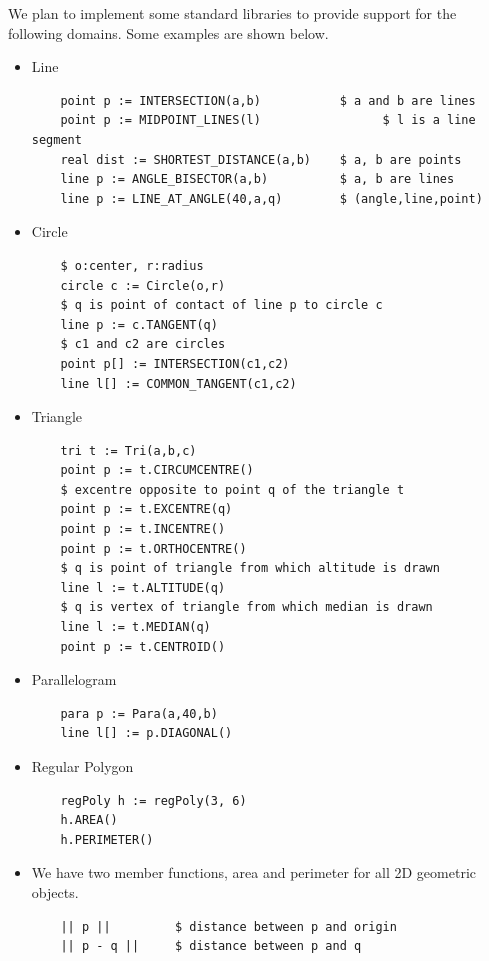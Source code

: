 \documentclass[12pt]{article}
\begin{document}
We plan to implement some standard libraries to provide support for the following domains. Some examples are shown below.
\begin{itemize}
    \item Line 
\begin{verbatim}
    point p := INTERSECTION(a,b)           $ a and b are lines
    point p := MIDPOINT_LINES(l)                 $ l is a line segment
    real dist := SHORTEST_DISTANCE(a,b)    $ a, b are points
    line p := ANGLE_BISECTOR(a,b)          $ a, b are lines
    line p := LINE_AT_ANGLE(40,a,q)        $ (angle,line,point)
\end{verbatim}
\item Circle
\begin{verbatim}
    $ o:center, r:radius
    circle c := Circle(o,r)                 
    $ q is point of contact of line p to circle c
    line p := c.TANGENT(q)  
    $ c1 and c2 are circles               
    point p[] := INTERSECTION(c1,c2)   
    line l[] := COMMON_TANGENT(c1,c2)
\end{verbatim}

\item Triangle
\begin{verbatim}
    tri t := Tri(a,b,c)
    point p := t.CIRCUMCENTRE()
    $ excentre opposite to point q of the triangle t
    point p := t.EXCENTRE(q) 
    point p := t.INCENTRE()    
    point p := t.ORTHOCENTRE() 
    $ q is point of triangle from which altitude is drawn  
    line l := t.ALTITUDE(q)
    $ q is vertex of triangle from which median is drawn  
    line l := t.MEDIAN(q)
    point p := t.CENTROID()            
\end{verbatim}

\item Parallelogram
\begin{verbatim}
    para p := Para(a,40,b)
    line l[] := p.DIAGONAL()
\end{verbatim}
\item Regular Polygon
\begin{verbatim}
    regPoly h := regPoly(3, 6)
    h.AREA()
    h.PERIMETER()
\end{verbatim}
\item We have two member functions, area and perimeter for all 2D geometric objects.
\begin{verbatim}
    || p ||         $ distance between p and origin
    || p - q ||     $ distance between p and q 
\end{verbatim}
\end{itemize}
\end{document}
